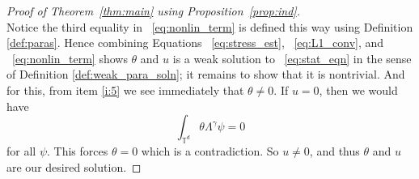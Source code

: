 \documentclass[10pt,a4paper]{amsart}
\newcommand{\T}{\mathbb T}
\begin{document}
\begin{proof}[Proof of Theorem~\ref{thm:main} using Proposition~\ref{prop:ind}]
\begin{equation}
\end{equation}
Notice the third equality in ~\eqref{eq:nonlin_term} is defined this way using Definition \ref{def:paras}. Hence combining Equations ~\eqref{eq:stress_est}, ~\eqref{eq:L1_conv}, and ~\eqref{eq:nonlin_term} shows $\theta$ and $u$ is a weak solution to ~\eqref{eq:stat_eqn} in the sense of Definition \ref{def:weak_para_soln}; it remains to show that it is nontrivial. And for this, from item \ref{i:5} we see immediately that $\theta \not =0$. If $u = 0$, then we would have
$$
\int_{\T^d} \theta \Lambda^\gamma \psi = 0
$$
for all $\psi$. This forces $\theta = 0$ which is a contradiction. So $u \not =0$, and thus $\theta$ and $u$ are our desired solution.

\end{proof}
\end{document}

